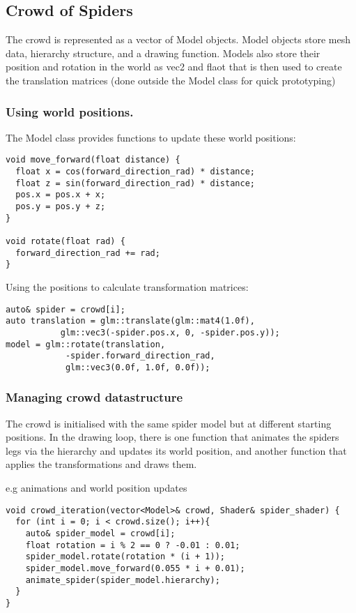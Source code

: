 \documentclass[11pt]{article}
\begin{document}
\subsection*{Crowd of Spiders}
\label{sec:orgf2e8088}
The crowd is represented as a vector of Model objects.   
Model objects store mesh data, hierarchy structure, and a drawing function.   
Models also store their position and rotation in the world as vec2 and flaot that is then used
to create the translation matrices (done outside the Model class for quick prototyping)   
\subsubsection*{Using world positions.}
\label{sec:orgf040116}
The Model class provides functions to update these world positions:
\begin{verbatim}
void move_forward(float distance) {
  float x = cos(forward_direction_rad) * distance;
  float z = sin(forward_direction_rad) * distance;
  pos.x = pos.x + x;
  pos.y = pos.y + z;
}

void rotate(float rad) {
  forward_direction_rad += rad;
}
\end{verbatim}
Using the positions to calculate transformation matrices:
\begin{verbatim}
auto& spider = crowd[i];
auto translation = glm::translate(glm::mat4(1.0f),
		   glm::vec3(-spider.pos.x, 0, -spider.pos.y));
model = glm::rotate(translation,
		    -spider.forward_direction_rad,
		    glm::vec3(0.0f, 1.0f, 0.0f));
\end{verbatim}
\subsubsection*{Managing crowd datastructure}
\label{sec:org5eb0c3d}
The crowd is initialised with the same spider model but at different starting positions.   
In the drawing loop, there is one function that animates the spiders legs via the hierarchy and updates its world 
position, and another function that applies the transformations and draws them.   

e.g animations and world position updates
\begin{verbatim}
void crowd_iteration(vector<Model>& crowd, Shader& spider_shader) {
  for (int i = 0; i < crowd.size(); i++){
    auto& spider_model = crowd[i];
    float rotation = i % 2 == 0 ? -0.01 : 0.01;
    spider_model.rotate(rotation * (i + 1));
    spider_model.move_forward(0.055 * i + 0.01);
    animate_spider(spider_model.hierarchy);
  }
}
\end{verbatim}
\end{document}
